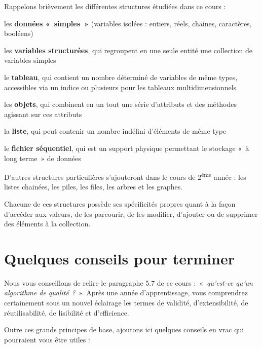 Rappelons brièvement les différentes structures étudiées dans ce cours :

\begin{liste}
	\item 
		les \textbf{données «~simples~»} (variables isolées : entiers, réels,
		chaines, caractères, booléens)
	\item 
		les \textbf{variables structurées}, qui regroupent en une seule entité
		une collection de variables simples
	\item 
		le \textbf{tableau}, qui contient un nombre déterminé de variables de
		même types, accessibles via un indice ou plusieurs pour les tableaux
		multidimensionnels
	\item 
		les \textbf{objets}, qui combinent en un tout une série d’attributs et
		des méthodes agissant sur ces attributs
	\item 
		la \textbf{liste}, qui peut contenir un nombre indéfini d’éléments de
		même type
	\item 
		le \textbf{fichier séquentiel}, qui est un support physique permettant
		le stockage «~à long terme~» de données
\end{liste}

D’autres structures particulières s’ajouteront dans le cours de
2\textsuperscript{ème} année : les listes chainées, les piles, les
files, les arbres et les graphes.

Chacune de ces structures possède ses spécificités propres quant à la
façon d’accéder aux valeurs, de les parcourir, de les modifier,
d’ajouter ou de supprimer des éléments à la collection. 


\section{Quelques conseils pour terminer}

Nous vous conseillons de relire le paragraphe 5.7 de ce cours
:~«~\textit{qu’est-ce qu’un algorithme de qualité ?}~». Après une année
d’apprentissage, vous comprendrez certainement sous un nouvel éclairage
les termes de validité, d’extensibilité, de réutilisabilité, de
lisibilité et d’efficience.

Outre ces grands principes de base, ajoutons ici quelques conseils en
vrac qui pourraient vous être utiles :

